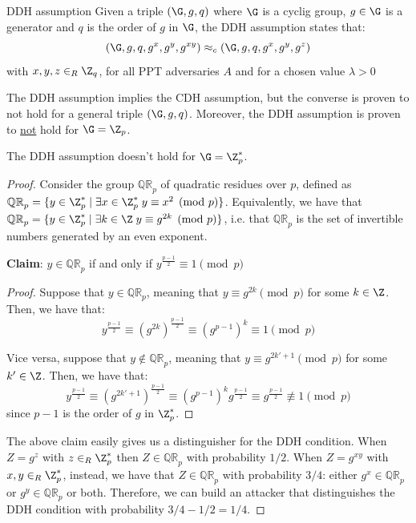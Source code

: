 \documentclass[a4paper, 12pt]{report}
\begin{document}
    \begin{framedass}{DDH assumption}
        Given a triple $(\G,g,q)$ where $\G$ is a cyclig group, $g \in \G$ is a generator and $q$ is the order of $g$ in $\G$, the DDH assumption states that:
        \[(\G,g,q,g^x,g^y, g^{xy}) \approx_c (\G,g,q,g^x,g^y, g^{z})\]
        with $x,y,z \in_R \Z_q$, for all PPT adversaries $A$ and for a chosen value $\lambda > 0$
    \end{framedass}

    The DDH assumption implies the CDH assumption, but the converse is proven to not hold for a general triple $(\G,g,q)$. Moreover, the DDH assumption is proven to \underline{not} hold for $\G = \Z_p$. 

    \begin{framedprop}{}
        The DDH assumption doesn't hold for $\G = \Z_p^*$.
    \end{framedprop}

    \begin{proof}
        Consider the group $\mathbb{QR}_p$ of quadratic residues over $p$, defined as $\mathbb{QR}_p = \{y \in \Z_p^* \mid \exists x \in \Z_p^* \; y \equiv x^2 \pmod p\}$. Equivalently, we have that $\mathbb{QR}_p = \{y \in \Z_p^* \mid \exists k \in \Z \; y \equiv g^{2k} \pmod p\}$, i.e. that $\mathbb{QR}_p$ is the set of invertible numbers generated by an even exponent.

        \textbf{Claim}: $y \in \mathbb{QR}_p$ if and only if $y^{\frac{p-1}{2}} \equiv 1 \pmod p$

        \begin{proof}
            Suppose that $y \in \mathbb{QR}_p$, meaning that $y \equiv g^{2k} \pmod p$ for some $k \in \Z$. Then, we have that:
            \[y^{\frac{p-1}{2}} \equiv (g^{2k})^{\frac{p-1}{2}} \equiv (g^{p-1})^k \equiv 1 \pmod p\]

            Vice versa, suppose that $y \notin \mathbb{QR}_p$, meaning that $y \equiv g^{2k'+1} \pmod p$ for some $k' \in \Z$. Then, we have that:
            \[y^{\frac{p-1}{2}} \equiv (g^{2k'+1})^{\frac{p-1}{2}} \equiv (g^{p-1})^k g^{\frac{p-1}{2}} \equiv g^{\frac{p-1}{2}} \not\equiv 1 \pmod p\]
            since $p-1$ is the order of $g$ in $\Z_p^*$.
        \end{proof}

        The above claim easily gives us a distinguisher for the DDH condition. When $Z = g^z$ with $z \in_R \Z_p^*$ then $Z \in \mathbb{QR}_p$ with probability $1/2$. When $Z = g^{xy}$ with $x,y \in_R \Z_p^*$, instead, we have that $Z \in \mathbb{QR}_p$ with probability $3/4$: either $g^x \in \mathbb{QR}_p$ or $g^y \in \mathbb{QR}_p$ or both. Therefore, we can build an attacker that distinguishes the DDH condition with probability $3/4 - 1/2 = 1/4$.
    \end{proof}
\end{document}

